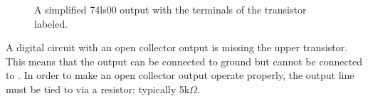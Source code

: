 \begin{figure}[ht]
\caption{A simplified 74ls00 output with the terminals of the 
transistor labeled.}
\label{fig:transistor}
\end{figure}

A digital circuit with an open collector output is missing the upper
transistor.  This means that the output can be connected to ground
but cannot be connected to \VCC.  In order to make an open collector
output operate properly, the output line must be tied to \VCC via
a resistor; typically 5k$\Omega$.

